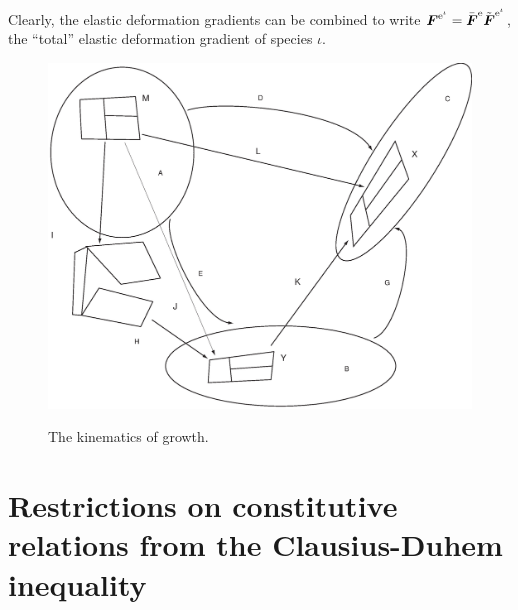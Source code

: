 \noindent Clearly, the elastic deformation gradients can be
combined to write $\mbox{\boldmath$ F$}^{\mathrm{e}^\iota} =
\bar{\mbox{\boldmath$ F$}}^\mathrm{e}\tilde{\mbox{\boldmath$ F$}}^{\mathrm{e}^\iota}$, the ``total''
elastic deformation gradient of species $\iota$.
\begin{figure}[ht]
 
 
 
   
    \centering
{\includegraphics[width=15cm]{images/growthkinematics.eps}} \caption{The
kinematics of growth.} \label{growthkinematicsfig}
\end{figure}

\section{Restrictions on constitutive relations from the
Clausius-Duhem inequality} \label{sect5}

